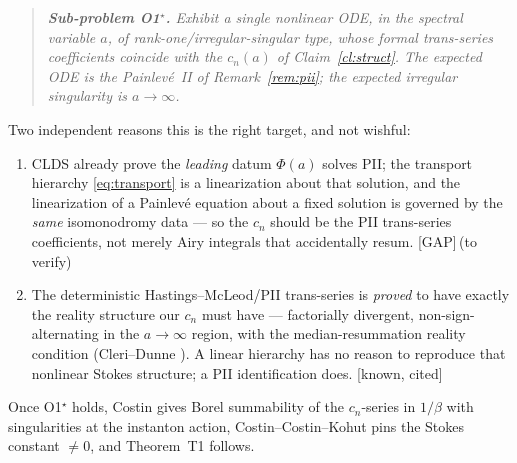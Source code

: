 \documentclass[11pt,reqno]{amsart}
\theoremstyle{plain}
\theoremstyle{remark}
\newcommand{\cited}{{\footnotesize\textsf{[known, cited]}}}
\newcommand{\gap}{{\footnotesize\textsf{[GAP]}}}
\begin{document}
\begin{quote}\itshape
\textbf{Sub-problem O1$^\star$.} Exhibit a single nonlinear ODE, in the spectral variable $a$, of
rank-one/irregular-singular type, whose formal trans-series coefficients coincide with the
$c_n(a)$ of Claim~\ref{cl:struct}. The expected ODE is the Painlev\'e~II of
Remark~\ref{rem:pii}; the expected irregular singularity is $a\to\infty$.
\end{quote}

Two independent reasons this is the right target, and not wishful:
\begin{enumerate}
\item[(R1)] CLDS already prove the \emph{leading} datum $\Phi(a)$ solves PII; the transport
hierarchy \eqref{eq:transport} is a linearization about that solution, and the linearization of a
Painlev\'e equation about a fixed solution is governed by the \emph{same} isomonodromy data ---
so the $c_n$ should be the PII trans-series coefficients, not merely Airy integrals that
accidentally resum. \gap\,(to verify)
\item[(R2)] The deterministic Hastings--McLeod/PII trans-series is \emph{proved} to have exactly
the reality structure our $c_n$ must have --- factorially divergent, non-sign-alternating in the
$a\to\infty$ region, with the median-resummation reality condition
(Cleri--Dunne \cite{CleriDunne}). A linear hierarchy has no reason to reproduce that nonlinear
Stokes structure; a PII identification does. \cited
\end{enumerate}

Once O1$^\star$ holds, Costin \cite{Costin} gives Borel summability of the $c_n$-series in
$1/\beta$ with singularities at the instanton action, Costin--Costin--Kohut \cite{CCK} pins the
Stokes constant $\ne0$, and Theorem~T1 follows.
\end{document}

